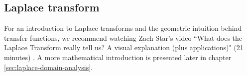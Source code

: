 \subsection{Laplace transform}

For an introduction to Laplace transforms and the geometric intuition behind
transfer functions, we recommend watching Zach Star's video ``What does the
Laplace Transform really tell us? A visual explanation (plus applications)" (21
minutes) \cite{bib:laplace_transform}. A more mathematical introduction is
presented later in chapter \ref{sec:laplace-domain-analysis}.
